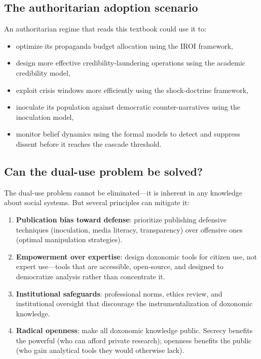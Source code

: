 \subsection{The authoritarian adoption scenario}

\begin{example}
\label{ex:authoritarian}
An authoritarian regime that reads this textbook could use it to:
\begin{itemize}[nosep]
  \item optimize its propaganda budget allocation using the IROI framework,
  \item design more effective credibility-laundering operations using the academic credibility model,
  \item exploit crisis windows more efficiently using the shock-doctrine framework,
  \item inoculate its population against democratic counter-narratives using the inoculation model,
  \item monitor belief dynamics using the formal models to detect and suppress dissent before it reaches the cascade threshold.
\end{itemize}
\end{example}

\subsection{Can the dual-use problem be solved?}

The dual-use problem cannot be eliminated---it is inherent in any knowledge about social systems.
But several principles can mitigate it:

\begin{enumerate}[nosep]
  \item \textbf{Publication bias toward defense}: prioritize publishing defensive techniques (inoculation, media literacy, transparency) over offensive ones (optimal manipulation strategies).
  \item \textbf{Empowerment over expertise}: design doxonomic tools for citizen use, not expert use---tools that are accessible, open-source, and designed to democratize analysis rather than concentrate it.
  \item \textbf{Institutional safeguards}: professional norms, ethics review, and institutional oversight that discourage the instrumentalization of doxonomic knowledge.
  \item \textbf{Radical openness}: make all doxonomic knowledge public. Secrecy benefits the powerful (who can afford private research); openness benefits the public (who gain analytical tools they would otherwise lack).
\end{enumerate}

